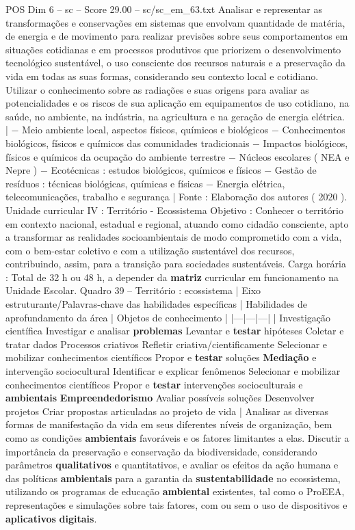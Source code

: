 \begin{textsample}{POS Dim 6 – sc – Score 29.00 – sc/sc\_em\_63.txt}
Analisar e representar as transformações e conservações em sistemas que envolvam quantidade de matéria, de energia e de movimento para realizar previsões sobre seus comportamentos em situações cotidianas e em processos produtivos que priorizem o desenvolvimento tecnológico sustentável, o uso consciente dos recursos naturais e a preservação da vida em todas as suas formas, considerando seu contexto local e cotidiano.
Utilizar o conhecimento sobre as radiações e suas origens para avaliar as potencialidades e os riscos de sua aplicação em equipamentos de uso cotidiano, na saúde, no ambiente, na indústria, na agricultura e na geração de energia elétrica. | − Meio ambiente local, aspectos físicos, químicos e biológicos − Conhecimentos biológicos, físicos e químicos das comunidades tradicionais − Impactos biológicos, físicos e químicos da ocupação do ambiente terrestre − Núcleos escolares ( NEA e Nepre ) − Ecotécnicas : estudos biológicos, químicos e físicos − Gestão de resíduos : técnicas biológicas, químicas e físicas − Energia elétrica, telecomunicações, trabalho e segurança | Fonte : Elaboração dos autores ( 2020 ).
Unidade curricular IV : Território - Ecossistema Objetivo : Conhecer o território em contexto nacional, estadual e regional, atuando como cidadão consciente, apto a transformar as realidades socioambientais de modo comprometido com a vida, com o bem-estar coletivo e com a utilização sustentável dos recursos, contribuindo, assim, para a transição para sociedades sustentáveis.
Carga horária : Total de 32 h ou 48 h, a depender da \textbf{matriz} curricular em funcionamento na Unidade Escolar.
Quadro 39 – Território : ecossistema | Eixo estruturante/Palavras-chave das habilidades específicas | Habilidades de aprofundamento da área | Objetos de conhecimento | |---|---|---| | Investigação científica Investigar e analisar \textbf{problemas} Levantar e \textbf{testar} hipóteses Coletar e tratar dados Processos criativos Refletir criativa/cientificamente Selecionar e mobilizar conhecimentos científicos Propor e \textbf{testar} soluções \textbf{Mediação} e intervenção sociocultural Identificar e explicar fenômenos Selecionar e mobilizar conhecimentos científicos Propor e \textbf{testar} intervenções socioculturais e \textbf{ambientais} \textbf{Empreendedorismo} Avaliar possíveis soluções Desenvolver projetos Criar propostas articuladas ao projeto de vida | Analisar as diversas formas de manifestação da vida em seus diferentes níveis de organização, bem como as condições \textbf{ambientais} favoráveis e os fatores limitantes a elas.
Discutir a importância da preservação e conservação da biodiversidade, considerando parâmetros \textbf{qualitativos} e quantitativos, e avaliar os efeitos da ação humana e das políticas \textbf{ambientais} para a garantia da \textbf{sustentabilidade} no ecossistema, utilizando os programas de educação \textbf{ambiental} existentes, tal como o ProEEA, representações e simulações sobre tais fatores, com ou sem o uso de dispositivos e \textbf{aplicativos} \textbf{digitais}.

\end{textsample}
